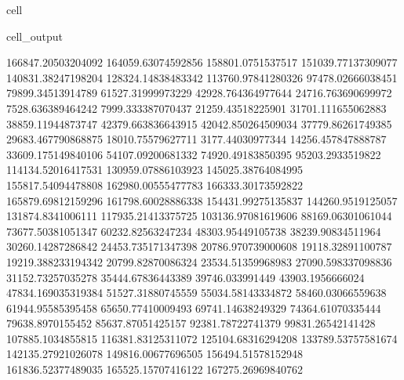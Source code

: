 \documentclass[letterpaper,10pt,english]{jupyterBook}
\begin{document}
\begin{sphinxuseclass}{cell}
\begin{sphinxVerbatimOutput}
\begin{sphinxuseclass}{cell_output}
\begin{sphinxVerbatim}[commandchars=\\\{\}]
166847.20503204092  164059.63074592856  158801.0751537517  151039.77137309077  140831.38247198204  128324.14838483342  113760.97841280326  97478.02666038451  79899.34513914789  61527.31999973229  42928.764364977644  24716.763690699972  7528.636389464242  \PYGZhy{}7999.333387070437  \PYGZhy{}21259.43518225901  \PYGZhy{}31701.111655062883  \PYGZhy{}38859.11944873747  \PYGZhy{}42379.663836643915  \PYGZhy{}42042.850264509034  \PYGZhy{}37779.86261749385  \PYGZhy{}29683.467790868875  \PYGZhy{}18010.75579627711  \PYGZhy{}3177.44030977344  14256.457847888787  33609.175149840106  54107.09200681332  74920.49183850395  95203.2933519822  114134.52016417531  130959.07886103923  145025.38764084995  155817.54094478808  162980.00555477783  166333.30173592822  165879.69812159296  161798.60028886338  154431.99275135837  144260.9519125057  131874.8341006111  117935.21413375725  103136.97081619606  88169.06301061044  73677.50381051347  60232.82563247234  48303.95449105738  38239.90834511964  30260.14287286842  24453.735171347398  20786.970739000608  19118.32891100787  19219.388233194342  20799.82870086324  23534.51359968983  27090.598337098836  31152.73257035278  35444.67836443389  39746.033991449  43903.1956666024  47834.169035319384  51527.31880745559  55034.58143334872  58460.03066559638  61944.95585395458  65650.77410009493  69741.14638249329  74364.61070335444  79638.8970155452  85637.87051425157  92381.78722741379  99831.26542141428  107885.1034855815  116381.83125311072  125104.68316294208  133789.53757581674  142135.27921026078  149816.00677696505  156494.51578152948  161836.52377489035  165525.15707416122  167275.26969840762  

\end{sphinxVerbatim}
\end{sphinxuseclass}
\end{sphinxVerbatimOutput}
\end{sphinxuseclass}
\end{document}
